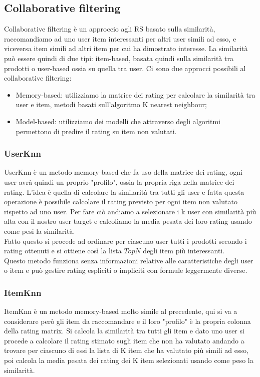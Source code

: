 \subsection{Collaborative filtering}
Collaborative filtering è un approccio agli RS basato sulla similarità, raccomandiamo ad uno user item interessanti per altri user simili ad esso, e viceversa item simili ad altri item per cui ha dimostrato interesse.
La similarità può essere quindi di due tipi: item-based, basata quindi sulla similarità tra prodotti o user-based ossia su quella tra user.
Ci sono due approcci possibili al collaborative filtering:
\begin{itemize}
	\item Memory-based: utilizziamo la matrice dei rating per calcolare la similarità tra user e item, metodi basati sull'algoritmo K nearest neighbour;
	\item Model-based: utilizziamo dei modelli che attraverso degli algoritmi permettono di predire il rating su item non valutati.
\end{itemize}

\subsubsection{UserKnn}
UserKnn è un metodo memory-based che fa uso della matrice dei rating, ogni user avrà quindi un proprio "profilo", ossia la propria riga nella matrice dei rating. L'idea è quella di calcolare la similarità tra tutti gli user e fatta questa operazione è possibile calcolare il rating previsto per ogni item non valutato rispetto ad uno user.
Per fare ciò andiamo a selezionare i k user con similarità più alta con il nostro user target e calcoliamo la media pesata dei loro rating usando come pesi la similarità.\\
Fatto questo si procede ad ordinare per ciascuno user tutti i prodotti secondo i rating ottenuti e si ottiene così la lista $TopN$ degli item più interessanti.\\
Questo metodo funziona senza informazioni relative alle caratteristiche degli user o item e può gestire rating espliciti o impliciti con formule leggermente diverse.

\subsubsection{ItemKnn}
ItemKnn è un metodo memory-based molto simile al precedente, qui si va a considerare però gli item da raccomandare e il loro "profilo" è la propria colonna della rating matrix. Si calcola la similarità tra tutti gli item e dato uno user si procede a calcolare il rating stimato sugli item che non ha valutato andando a trovare per ciascuno di essi la lista di K item che ha valutato più simili ad esso, poi calcola la media pesata dei rating dei K item selezionati usando come peso la similarità. 
 
